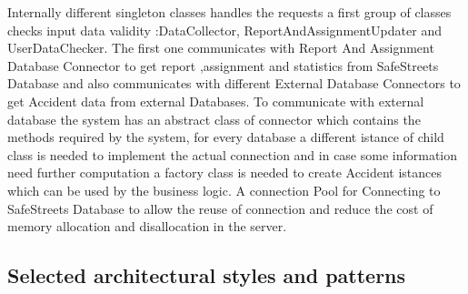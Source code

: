 Internally different singleton classes handles the requests a first group of classes checks input data validity :DataCollector, ReportAndAssignmentUpdater and UserDataChecker. The first one communicates with Report And Assignment Database Connector to get report ,assignment and statistics from SafeStreets Database and also communicates with different External Database Connectors to get Accident data from external Databases. To communicate with external database the system has an abstract class of connector which contains the methods required by the system, for every database a different istance of child class  is needed to implement the actual connection and in case some information need further computation a factory class is needed to create Accident istances which can be used by the business logic. A connection Pool for Connecting to SafeStreets Database to allow the reuse of connection and reduce the cost of memory allocation and disallocation in the server.
\clearpage
\subsection{Selected architectural styles and patterns}
